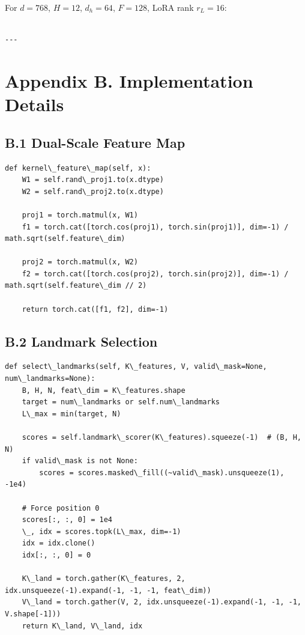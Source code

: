 For $d = 768$, $H = 12$, $d_h = 64$, $F = 128$, LoRA rank $r_L = 16$:

\begin{lstlisting}

---
\end{lstlisting}

\section{Appendix B. Implementation Details}

\subsection{B.1 Dual-Scale Feature Map}

\begin{lstlisting}
def kernel\_feature\_map(self, x):
    W1 = self.rand\_proj1.to(x.dtype)
    W2 = self.rand\_proj2.to(x.dtype)
    
    proj1 = torch.matmul(x, W1)
    f1 = torch.cat([torch.cos(proj1), torch.sin(proj1)], dim=-1) / math.sqrt(self.feature\_dim)
    
    proj2 = torch.matmul(x, W2)
    f2 = torch.cat([torch.cos(proj2), torch.sin(proj2)], dim=-1) / math.sqrt(self.feature\_dim // 2)
    
    return torch.cat([f1, f2], dim=-1)
\end{lstlisting}

\subsection{B.2 Landmark Selection}

\begin{lstlisting}
def select\_landmarks(self, K\_features, V, valid\_mask=None, num\_landmarks=None):
    B, H, N, feat\_dim = K\_features.shape
    target = num\_landmarks or self.num\_landmarks
    L\_max = min(target, N)
    
    scores = self.landmark\_scorer(K\_features).squeeze(-1)  # (B, H, N)
    if valid\_mask is not None:
        scores = scores.masked\_fill((~valid\_mask).unsqueeze(1), -1e4)
    
    # Force position 0
    scores[:, :, 0] = 1e4
    \_, idx = scores.topk(L\_max, dim=-1)
    idx = idx.clone()
    idx[:, :, 0] = 0
    
    K\_land = torch.gather(K\_features, 2, idx.unsqueeze(-1).expand(-1, -1, -1, feat\_dim))
    V\_land = torch.gather(V, 2, idx.unsqueeze(-1).expand(-1, -1, -1, V.shape[-1]))
    return K\_land, V\_land, idx
\end{lstlisting}

